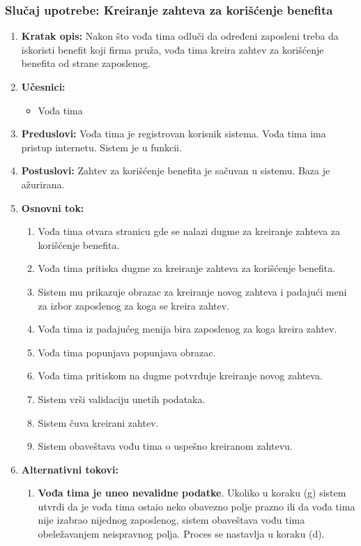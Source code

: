 \documentclass[a4paper]{article}
\begin{document}
\subsubsection{Slučaj upotrebe: Kreiranje zahteva za korišćenje benefita}
\begin{enumerate}
    \item \textbf{Kratak opis:} Nakon što vođa tima odluči da određeni zaposleni treba da iskoristi benefit koji firma pruža, vođa tima kreira zahtev za korišćenje benefita od strane zaposlenog.
    \item \textbf{Učesnici:}
        \begin{itemize}
            \item Vođa tima
        \end{itemize}
    \item \textbf{Preduslovi:} Vođa tima je registrovan korisnik sistema. Vođa tima ima pristup internetu. Sistem je u funkcii.
    \item \textbf{Postuslovi:} Zahtev za korišćenje benefita je sačuvan u sistemu. Baza je ažurirana.
    \item \textbf{Osnovni tok:}
        \begin{enumerate}
            \item Vođa tima otvara stranicu gde se nalazi dugme za kreiranje zahteva za korišćenje benefita.
            \item Vođa tima pritiska dugme za kreiranje zahteva za korišćenje benefita.
            \item Sistem mu prikazuje obrazac za kreiranje novog zahteva i padajući meni za izbor zaposlenog za koga se kreira zahtev.
            \item Vođa tima iz padajućeg menija bira zaposlenog za koga kreira zahtev.
            \item Vođa tima popunjava popunjava obrazac.
            \item Vođa tima pritiskom na dugme potvrđuje kreiranje novog zahteva.
            \item Sistem vrši validaciju unetih podataka.
            \item Sistem čuva kreirani zahtev.
            \item Sistem obaveštava vođu tima o uspešno kreiranom zahtevu.
        \end{enumerate}
    \item \textbf{Alternativni tokovi:}
        \begin{enumerate}
            \item \textbf{Vođa tima je uneo nevalidne podatke}. Ukoliko u koraku (g) sistem utvrdi da je vođa tima ostaio neko obavezno polje prazno ili da vođa tima nije izabrao nijednog zaposlenog, sistem obaveštava vođu tima obeležavanjem neispravnog polja. Proces se nastavlja u koraku (d).

\end{enumerate}
\end{enumerate}
\end{document}
